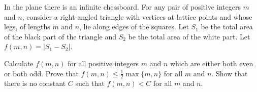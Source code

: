 In the plane there is an infinite chessboard.
For any pair of positive integers $m$ and $n$,
consider a right-angled triangle with vertices at lattice points
and whose legs, of lengths $m$ and $n$, lie along edges of the squares.
Let $S_1$ be the total area of the black part of the triangle
and $S_2$ be the total area of the white part.
Let $f(m,n) = | S_1 - S_2 |$.


\begin{enumerate}[(a)]
  \ii Calculate $f(m,n)$ for all positive integers $m$ and $n$
  which are either both even or both odd.
  \ii Prove that $f(m,n) \leq \frac 12 \max \{m,n\}$ for all $m$ and $n$.
  \ii Show that there is no constant $C$
  such that $f(m,n) < C$ for all $ m$ and $ n$.
\end{enumerate}